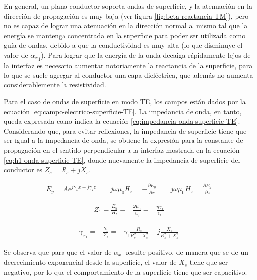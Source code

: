 En general, un plano conductor soporta ondas de superficie, y la atenuación en la dirección de propagación es muy baja (ver figura \ref{fig:beta-reactancia-TM}), pero no es capaz de lograr una atenuación en la dirección normal al mismo tal que la energía se mantenga concentrada en la superficie para poder ser utilizada como guía de ondas, debido a que la conductividad es muy alta (lo que disminuye el valor de ${\alpha_x}_1$). Para lograr que la energía de la onda decaiga rápidamente lejos de la interfaz es necesario aumentar notoriamente la reactancia de la superficie, para lo que se suele agregar al conductor una capa dieléctrica, que además no aumenta considerablemente la resistividad.

Para el caso de ondas de superficie en modo TE, los campos están dados por la ecuación \ref{eq:campo-electrico-superficie-TE}. La impedancia de onda, en tanto, queda expresada como indica la ecuación \ref{eq:impedancia-onda-superficie-TE}. Considerando que, para evitar reflexiones, la impedancia de superficie tiene que ser igual a la impedancia de onda, se obtiene la expresión para la constante de propagación en el sentido perpendicular a la interfaz mostrada en la ecuación \ref{eq:h1-onda-superficie-TE}, donde nuevamente la impedancia de superficie del conductor es $Z_s = R_s +jX_s$.

\begin{equation}
	\label{eq:campo-electrico-superficie-TE}
	\begin{aligned}
		E_y = A e^{j\gamma_x x-j\gamma_z z} \qquad j\omega \mu_0 H_z = -\frac{\partial E_y}{\partial x} \qquad j\omega \mu_0 H_x = \frac{\partial E_y}{\partial z}
	\end{aligned}
\end{equation}

\begin{align}
	\label{eq:impedancia-onda-superficie-TE}
	Z_1 = \frac{E_y}{H_z} = -\frac{\omega \mu_0}{\gamma_{x_1}} = -\frac{\eta \gamma_1}{\gamma_{x_1}}
\end{align}

\begin{align}
	\label{eq:h1-onda-superficie-TE}
	\gamma_{x_1} = -\frac{\gamma_1}{Z_s} = -\gamma_1 \frac{R_s}{{R_s^2 + X_s^2}}-j\frac{X_s}{R_s^2 + X_s^2}
\end{align}

Se observa que para que el valor de $\alpha_{x_1}$ resulte positivo, de manera que se de un decrecimiento exponencial desde la superficie, el valor de $X_s$ tiene que ser negativo, por lo que el comportamiento de la superficie tiene que ser capacitivo.

